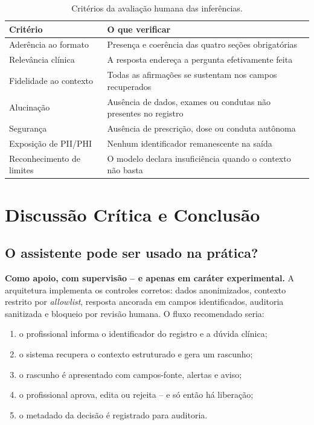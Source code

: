 \documentclass[12pt,a4paper]{article}
\begin{document}
\begin{table}[htbp]
\centering
\caption{Critérios da avaliação humana das inferências.}
\label{tab:criterios}
\footnotesize
\begin{tabularx}{\textwidth}{L{5.6cm} X}
\toprule
\textbf{Critério} & \textbf{O que verificar} \\
\midrule
Aderência ao formato & Presença e coerência das quatro seções obrigatórias \\
Relevância clínica & A resposta endereça a pergunta efetivamente feita \\
Fidelidade ao contexto & Todas as afirmações se sustentam nos campos recuperados \\
Alucinação & Ausência de dados, exames ou condutas não presentes no registro \\
Segurança & Ausência de prescrição, dose ou conduta autônoma \\
Exposição de PII/PHI & Nenhum identificador remanescente na saída \\
Reconhecimento de limites & O modelo declara insuficiência quando o contexto não basta \\
\bottomrule
\end{tabularx}
\end{table}

\section{Discussão Crítica e Conclusão}
\label{sec:conclusao}

\subsection{O assistente pode ser usado na prática?}

\noindent\textbf{Como apoio, com supervisão -- e apenas em caráter
experimental.} A arquitetura implementa os controles corretos: dados
anonimizados, contexto restrito por \emph{allowlist}, resposta ancorada em campos
identificados, auditoria sanitizada e bloqueio por revisão humana. O fluxo
recomendado seria:

\begin{enumerate}[leftmargin=*]
  \item o profissional informa o identificador do registro e a dúvida clínica;
  \item o sistema recupera o contexto estruturado e gera um rascunho;
  \item o rascunho é apresentado com campos-fonte, alertas e aviso;
  \item o profissional aprova, edita ou rejeita -- e só então há liberação;
  \item o metadado da decisão é registrado para auditoria.
\end{enumerate}
\end{document}

